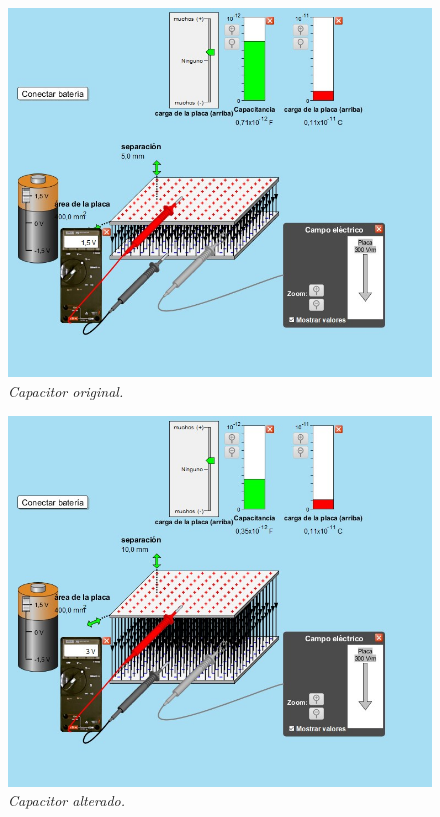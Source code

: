 \documentclass[12pt]{report}
\begin{document}
\begin{enumerate}
\begin{enumerate}
      \begin{figure}[h]
          \centering
          \begin{minipage}[h]{0.4\textwidth}
          \centering
          \includegraphics[width=1\textwidth]{./images/3foto4.jpg} 
          \textit{Capacitor original.} 
          \end{minipage}\hskip 1cm
          \begin{minipage}[h]{0.4\textwidth}
          \centering
          \includegraphics[width=1\textwidth]{./images/3foto5.jpg} 
          \textit{Capacitor alterado.} 
       \end{minipage}
      \end{figure}


\end{enumerate}
\end{enumerate}
\end{document}
